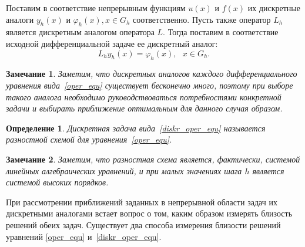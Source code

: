 \documentclass[11pt,a4paper,twoside]{report}
\numberwithin{equation}{section}
\newtheorem*{definition}{Определение}
\theoremstyle{definition}
\theoremstyle{plain}
\newtheorem*{note*}{Замечание}
\begin{document}
Поставим в соответствие непрерывным функциям $u(x)$ и $f(x)$ их дискретные аналоги
$y_h(x)$ и $\varphi_h(x), x \in G_h$ соответственно. Пусть также оператор $L_h$ является
дискретным аналогом оператора $L$. Тогда поставим в
соответствие исходной дифференциальной задаче ее дискретный аналог:
%
\begin{equation}
%
    \label{diskr_oper_equ}
    L_h{y_h(x)} = \varphi_h(x),~~~x\in G_h.
\end{equation}
%
\begin{note*}
    Заметим, что дискретных аналогов каждого дифференциального уравнения
    вида~\eqref{oper_equ}
    существует бесконечно много, поэтому при выборе такого аналога необходимо
    руководствоваться потребностями конкретной задачи и выбирать приближение
    оптимальным для данного случая образом.
\end{note*}
%
\begin{definition}
%
    Дискретная задача вида~\eqref{diskr_oper_equ} называется
    разностной схемой для уравнения~\eqref{oper_equ}.
%
\end{definition}
%
\begin{note*}
%
    Заметим, что разностная схема является, фактически, системой линейных алгебраических
    уравнений, и при малых значениях шага $h$ является системой высоких порядков.
%
\end{note*}
%

При рассмотрении приближений заданных в непрерывной области задач их дискретными
аналогами встает вопрос о том, каким образом измерять близость решений обеих задач.
Существует два способа измерения близости решений уравнений
\eqref{oper_equ} и~\eqref{diskr_oper_equ}.
\end{document}
